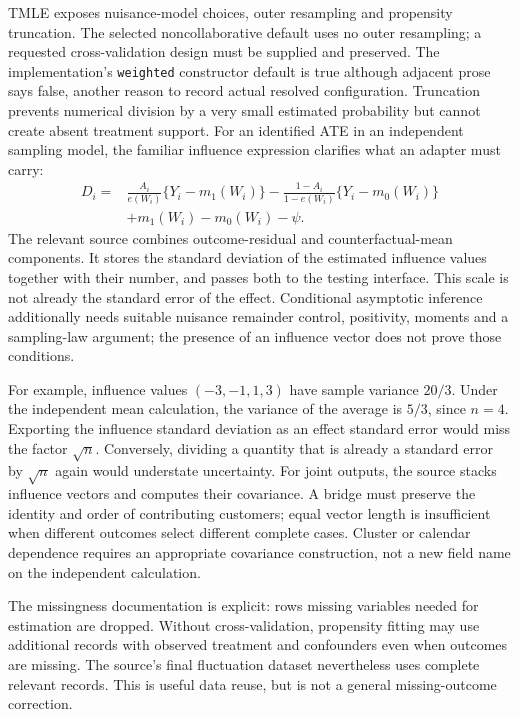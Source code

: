 TMLE exposes nuisance-model choices, outer resampling and propensity
truncation. The selected noncollaborative default uses no outer resampling;
a requested cross-validation design must be supplied and preserved. The
implementation's \texttt{weighted} constructor default is true although
adjacent prose says false, another reason to record actual resolved
configuration. Truncation prevents numerical division by a very small
estimated probability but cannot create absent treatment support. For an
identified ATE in an independent sampling model, the familiar influence
expression clarifies what an adapter must carry:
\begin{equation}
\label{exec21:effects-influence}
\begin{aligned}
 D_i={}&\frac{A_i}{e(W_i)}\{Y_i-m_1(W_i)\}
       -\frac{1-A_i}{1-e(W_i)}\{Y_i-m_0(W_i)\}\\
       &+m_1(W_i)-m_0(W_i)-\psi .
\end{aligned}
\end{equation}
The relevant source combines outcome-residual and counterfactual-mean
components. It stores the standard deviation of the estimated influence
values together with their number, and passes both to the testing
interface. This scale is not already the standard error of the effect.
Conditional asymptotic inference additionally needs suitable nuisance
remainder control, positivity, moments and a sampling-law argument; the
presence of an influence vector does not prove those conditions.
\citep{exec21_effects_tmle}

For example, influence values $(-3,-1,1,3)$ have sample variance $20/3$.
Under the independent mean calculation, the variance of the average is
$5/3$, since $n=4$. Exporting the influence standard deviation as an effect
standard error would miss the factor $\sqrt n$. Conversely, dividing a
quantity that is already a standard error by $\sqrt n$ again would understate
uncertainty. For joint outputs, the source stacks influence vectors and
computes their covariance. A bridge must preserve the identity and order
of contributing customers; equal vector length is insufficient when
different outcomes select different complete cases. Cluster or calendar
dependence requires an appropriate covariance construction, not a new field
name on the independent calculation. \citep{exec21_effects_tmle,exec21_effects_reference}

The missingness documentation is explicit: rows missing variables needed
for estimation are dropped. Without cross-validation, propensity fitting
may use additional records with observed treatment and confounders even
when outcomes are missing. The source's final fluctuation dataset nevertheless
uses complete relevant records. This is useful data reuse, but is not a
general missing-outcome correction. \citep{exec21_effects_tmle}

